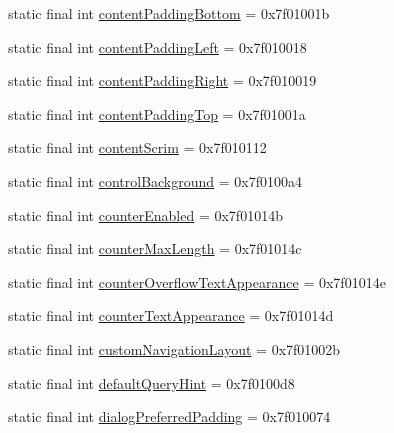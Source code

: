 \begin{CompactItemize}
static final int \hyperlink{classandroid_1_1support_1_1v7_1_1mediarouter_1_1_r_1_1attr_42d637b114d422ee39af5639db8cc9c3}{contentPaddingBottom} = 0x7f01001b
\item 
static final int \hyperlink{classandroid_1_1support_1_1v7_1_1mediarouter_1_1_r_1_1attr_af7df35e229adce163aedc1a3a5a3e25}{contentPaddingLeft} = 0x7f010018
\item 
static final int \hyperlink{classandroid_1_1support_1_1v7_1_1mediarouter_1_1_r_1_1attr_7be343fd6d602136716ae90a7a3ae20a}{contentPaddingRight} = 0x7f010019
\item 
static final int \hyperlink{classandroid_1_1support_1_1v7_1_1mediarouter_1_1_r_1_1attr_d3eac08ab8842d0ef72b133b25f37312}{contentPaddingTop} = 0x7f01001a
\item 
static final int \hyperlink{classandroid_1_1support_1_1v7_1_1mediarouter_1_1_r_1_1attr_8f20f2f3ee0479c2d8ae423ee2d73d04}{contentScrim} = 0x7f010112
\item 
static final int \hyperlink{classandroid_1_1support_1_1v7_1_1mediarouter_1_1_r_1_1attr_355cb45c9297056c4b4b0933516165b7}{controlBackground} = 0x7f0100a4
\item 
static final int \hyperlink{classandroid_1_1support_1_1v7_1_1mediarouter_1_1_r_1_1attr_6f2181796681edaef1b361f92f94524b}{counterEnabled} = 0x7f01014b
\item 
static final int \hyperlink{classandroid_1_1support_1_1v7_1_1mediarouter_1_1_r_1_1attr_701b9ebac0a0817a6f528c0008af1056}{counterMaxLength} = 0x7f01014c
\item 
static final int \hyperlink{classandroid_1_1support_1_1v7_1_1mediarouter_1_1_r_1_1attr_88e1527c4239cbd3d0d3ca4d4cb3ee11}{counterOverflowTextAppearance} = 0x7f01014e
\item 
static final int \hyperlink{classandroid_1_1support_1_1v7_1_1mediarouter_1_1_r_1_1attr_a9acd16216aaf56b83297e0f9bdbf3ac}{counterTextAppearance} = 0x7f01014d
\item 
static final int \hyperlink{classandroid_1_1support_1_1v7_1_1mediarouter_1_1_r_1_1attr_b415fc15dbfb32bb00ff2ab40517bfc7}{customNavigationLayout} = 0x7f01002b
\item 
static final int \hyperlink{classandroid_1_1support_1_1v7_1_1mediarouter_1_1_r_1_1attr_5529585016e0226a7cbea5a80afdccbc}{defaultQueryHint} = 0x7f0100d8
\item 
static final int \hyperlink{classandroid_1_1support_1_1v7_1_1mediarouter_1_1_r_1_1attr_247ba2fdb4f97bcdbb8f076efdafb1dd}{dialogPreferredPadding} = 0x7f010074
\item 

\end{CompactItemize}

